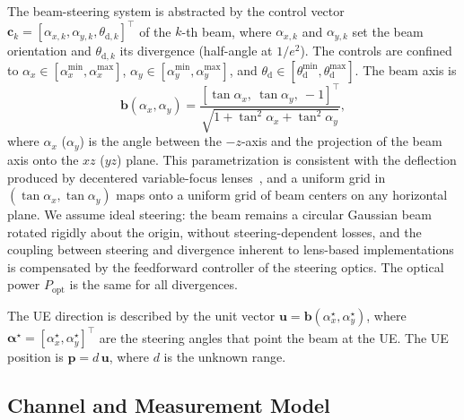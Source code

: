 \documentclass[journal]{IEEEtran}
\begin{document}
The beam-steering system is abstracted by the control vector
$\mathbf{c}_k=[\alpha_{x,k},\alpha_{y,k},\theta_{\mathrm{d},k}]^{\top}$
of the $k$-th beam, where $\alpha_{x,k}$ and $\alpha_{y,k}$ set the beam
orientation and $\theta_{\mathrm{d},k}$ its divergence (half-angle at
$1/e^{2}$). The controls are confined to
$\alpha_{x}\in[\alpha_{x}^{\min},\alpha_{x}^{\max}]$,
$\alpha_{y}\in[\alpha_{y}^{\min},\alpha_{y}^{\max}]$, and
$\theta_{\mathrm{d}}\in[\theta_{\mathrm{d}}^{\min},\theta_{\mathrm{d}}^{\max}]$.
The beam axis is
\begin{equation}
  \mathbf{b}(\alpha_x,\alpha_y)=
  \frac{[\tan\alpha_x,\ \tan\alpha_y,\ -1]^{\top}}
       {\sqrt{1+\tan^{2}\alpha_x+\tan^{2}\alpha_y}},
  \label{eq:beam_axis}
\end{equation}
where $\alpha_x$ ($\alpha_y$) is the angle between the $-z$-axis and the
projection of the beam axis onto the $xz$ ($yz$) plane. This
parametrization is consistent with the deflection produced by decentered
variable-focus lenses~\cite{MOSAIC}, and a uniform grid in
$(\tan\alpha_x,\tan\alpha_y)$ maps onto a uniform grid of beam centers on
any horizontal plane. We assume ideal steering: the beam remains a
circular Gaussian beam rotated rigidly about the origin, without
steering-dependent losses, and the coupling between steering and
divergence inherent to lens-based implementations is compensated by the
feedforward controller of the steering optics. The optical power
$P_{\mathrm{opt}}$ is the same for all divergences.

The UE direction is described by the unit vector
$\mathbf{u}=\mathbf{b}(\alpha_x^{\star},\alpha_y^{\star})$, where
$\boldsymbol{\alpha}^{\star}=[\alpha_x^{\star},\alpha_y^{\star}]^{\top}$
are the steering angles that point the beam at the UE. The UE position is
$\mathbf{p}=d\,\mathbf{u}$, where $d$ is the unknown range.

\subsection{Channel and Measurement Model}
\end{document}
